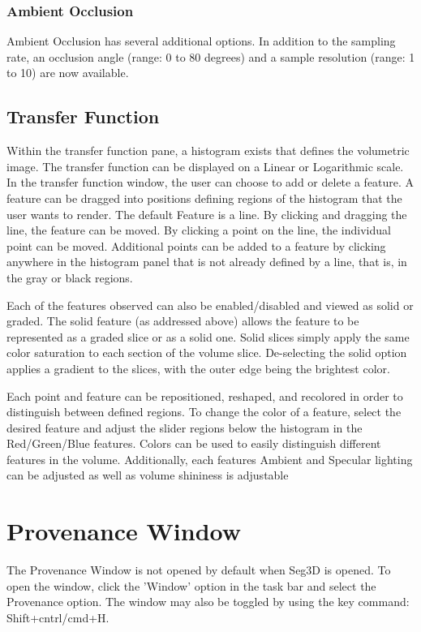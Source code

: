 \documentclass[fleqn,11pt,openany]{book}
\begin{document}
\subsubsection{Ambient Occlusion}
Ambient Occlusion has several additional options.
In addition to the sampling rate, an occlusion angle (range: 0 to 80 degrees) and a sample resolution (range: 1 to 10) are now available.



\subsection{Transfer Function}
Within the transfer function pane, a histogram exists that defines the volumetric image.
The transfer function can be displayed on a Linear or Logarithmic scale.
In the transfer function window, the user can choose to add or delete a feature.
A feature can be dragged into positions defining regions of the histogram that the user wants to render.
The default Feature is a line.  
By clicking and dragging the line, the feature can be moved.
By clicking a point on the line, the individual point can be moved.
Additional points can be added to a feature by clicking anywhere in the histogram panel  that is not already defined by a line, that is, in the gray or black regions.

Each of the features observed can also be enabled/disabled and viewed as solid or graded.
The solid feature (as addressed above) allows the feature to be represented as a graded slice or as a solid one.
Solid slices simply apply the same color saturation to each section of the volume slice.
De-selecting the solid option applies a gradient to the slices, with the outer edge being the brightest color.

Each point and feature can be repositioned, reshaped, and recolored in order to distinguish between defined regions.
To change the color of a feature, select the desired feature and adjust the slider regions below the histogram in the Red/Green/Blue features.
Colors can be used to easily distinguish different features in the volume.
Additionally, each features Ambient and Specular lighting can be adjusted as well as volume shininess is adjustable



\section{Provenance Window}
The Provenance Window is not opened by default when Seg3D is opened.  To open the window, click the 'Window' option in the task bar and select the Provenance option.  The window may also be toggled by using the key command: Shift+cntrl/cmd+H.
\end{document}
